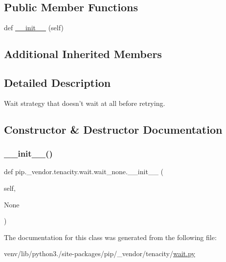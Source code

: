\subsection*{Public Member Functions}
\begin{DoxyCompactItemize}
\item 
def \hyperlink{classpip_1_1__vendor_1_1tenacity_1_1wait_1_1wait__none_a073d2a0934c6b7f4d03b96d79b15a3b9}{\+\_\+\+\_\+init\+\_\+\+\_\+} (self)
\end{DoxyCompactItemize}
\subsection*{Additional Inherited Members}


\subsection{Detailed Description}
\begin{DoxyVerb}Wait strategy that doesn't wait at all before retrying.\end{DoxyVerb}
 

\subsection{Constructor \& Destructor Documentation}
\mbox{\label{classpip_1_1__vendor_1_1tenacity_1_1wait_1_1wait__none_a073d2a0934c6b7f4d03b96d79b15a3b9}} 
\subsubsection{\texorpdfstring{\+\_\+\+\_\+init\+\_\+\+\_\+()}{\_\_init\_\_()}}
{\footnotesize\ttfamily def pip.\+\_\+vendor.\+tenacity.\+wait.\+wait\+\_\+none.\+\_\+\+\_\+init\+\_\+\+\_\+ (\begin{DoxyParamCaption}\item[{}]{self,  }\item[{}]{None }\end{DoxyParamCaption})}



The documentation for this class was generated from the following file\+:\begin{DoxyCompactItemize}
\item 
venv/lib/python3./site-\/packages/pip/\+\_\+vendor/tenacity/\hyperlink{tenacity_2wait_8py}{wait.\+py}\end{DoxyCompactItemize}

